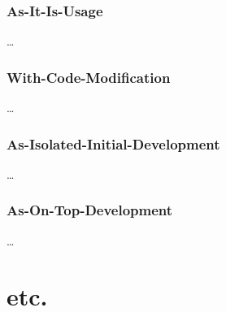 \subsubsection{As-It-Is-Usage}
\ldots
\subsubsection{With-Code-Modification}
\ldots
\subsubsection{As-Isolated-Initial-Development}
\ldots
\subsubsection{As-On-Top-Development}
\ldots

\section{etc.}


%
